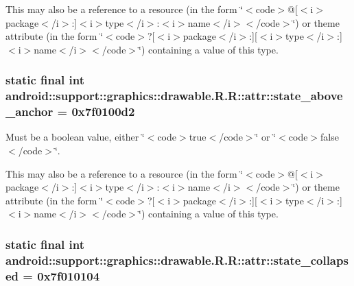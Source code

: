 This may also be a reference to a resource (in the form \char`\"{}$<$code$>$@\mbox{[}$<$i$>$package$<$/i$>$:\mbox{]}$<$i$>$type$<$/i$>$:$<$i$>$name$<$/i$>$$<$/code$>$\char`\"{}) or theme attribute (in the form \char`\"{}$<$code$>$?\mbox{[}$<$i$>$package$<$/i$>$:\mbox{]}\mbox{[}$<$i$>$type$<$/i$>$:\mbox{]}$<$i$>$name$<$/i$>$$<$/code$>$\char`\"{}) containing a value of this type. \hypertarget{classandroid_1_1support_1_1graphics_1_1drawable_1_1_r_1_1attr_c3063ec611b76eed44aa7b7ca08c8bd3}{
\subsubsection[{state\_\-above\_\-anchor}]{\setlength{\rightskip}{0pt plus 5cm}static final int android::support::graphics::drawable.R.R::attr::state\_\-above\_\-anchor = 0x7f0100d2}}
\label{classandroid_1_1support_1_1graphics_1_1drawable_1_1_r_1_1attr_c3063ec611b76eed44aa7b7ca08c8bd3}


Must be a boolean value, either \char`\"{}$<$code$>$true$<$/code$>$\char`\"{} or \char`\"{}$<$code$>$false$<$/code$>$\char`\"{}. 

This may also be a reference to a resource (in the form \char`\"{}$<$code$>$@\mbox{[}$<$i$>$package$<$/i$>$:\mbox{]}$<$i$>$type$<$/i$>$:$<$i$>$name$<$/i$>$$<$/code$>$\char`\"{}) or theme attribute (in the form \char`\"{}$<$code$>$?\mbox{[}$<$i$>$package$<$/i$>$:\mbox{]}\mbox{[}$<$i$>$type$<$/i$>$:\mbox{]}$<$i$>$name$<$/i$>$$<$/code$>$\char`\"{}) containing a value of this type. \hypertarget{classandroid_1_1support_1_1graphics_1_1drawable_1_1_r_1_1attr_c9000c73c233475c748d3a7e58009893}{
\subsubsection[{state\_\-collapsed}]{\setlength{\rightskip}{0pt plus 5cm}static final int android::support::graphics::drawable.R.R::attr::state\_\-collapsed = 0x7f010104}}
\label{classandroid_1_1support_1_1graphics_1_1drawable_1_1_r_1_1attr_c9000c73c233475c748d3a7e58009893}


